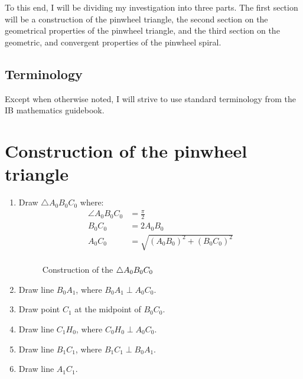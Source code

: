 To this end, I will be dividing my investigation into three parts. The first section will be a construction of the pinwheel triangle, the second section on the geometrical properties of the pinwheel triangle, and the third section on the geometric, and convergent properties of the pinwheel spiral.

\subsection{Terminology}
Except when otherwise noted, I will strive to use standard terminology from the IB mathematics guidebook.

\newpage
\section{Construction of the pinwheel triangle}
\begin{enumerate}
    \item Draw $\triangle A_{0}B_{0}C_{0}$ where:
    \begin{equation}
        \begin{aligned}
            \angle A_{0}B_{0}C_{0} &= \frac{\pi}{2} \\
            B_{0}C_{0} &= 2A_{0}B_{0} \\
            A_{0}C_{0} &= \sqrt{(A_{0}B_{0})^2 + (B_{0}C_{0})^2} \\
        \end{aligned}
    \end{equation}
    \begin{figure}[H]
        \centering
        \label{right-triangle}
        \caption{Construction of the $\protect\triangle A_{0}B_{0}C_{0}$}
    \end{figure}

    \item Draw line $B_{0}A_{1}$, where $B_{0}A_{1} \perp A_{0}C_{0}$.
    \item Draw point $C_{1}$ at the midpoint of $B_{0}C_{0}$.
    \item Draw line $C_{1}H_{0}$, where $C_{0}H_{0} \perp A_{0}C_{0}$.
    \item Draw line $B_{1}C_{1}$, where $B_{1}C_{1} \perp B_{0}A_{1}$.
    \item Draw line $A_{1}C_{1}$.
\end{enumerate}

